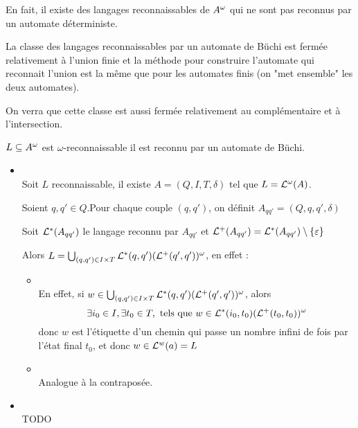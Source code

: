 En fait, il existe des langages reconnaissables de $A^{\omega}$ qui ne sont pas reconnus par un automate déterministe.



La classe des langages reconnaissables par un automate de Büchi est fermée relativement à l'union finie
et la méthode pour construire l'automate qui reconnait l'union est la même que pour les automates finis (on "met ensemble"
les deux automates).

On verra que cette classe est aussi fermée relativement au complémentaire et à l'intersection.


\begin{theorem}
	$L \subseteq A^{\omega}$ est $\omega$-reconnaissable \ssi il est reconnu par un automate de Büchi.
\end{theorem}

\begin{proofI}
	\begin{itemize}
		\item \bimpRL \\
		      Soit $L$ reconnaissable, il existe $A = (Q,I,T,\delta)$ tel que $L = \mathcal{L}^{\omega}(A)$.

		      Soient $q,q' \in Q$.Pour chaque couple $(q,q')$, on définit $A_{qq'} = (Q,q,q',\delta)$

		      Soit $\mathcal{L}^*(A_{qq'})$ le langage reconnu par $A_{qq'}$ et $\mathcal{L}^+(A_{qq'}) = \mathcal{L}^*(A_{qq'}) \setminus \left\{\varepsilon\right\}$


		      Alors $L = \bigcup_{(q,q') \in I \times T} \mathcal{L}^*(q,q')(\mathcal{L}^+(q',q'))^{\omega}$, en effet :

		      \begin{itemize}
			      \item \fbox{$\supseteq$} \\
			            En effet, si $w \in \bigcup_{(q,q') \in I \times T} \mathcal{L}^*(q,q')(\mathcal{L}^+(q',q'))^{\omega}$, alors
			            $$\exists i_0 \in I, \exists t_0 \in T, \text{ tels que } w \in \mathcal{L}^*(i_0,t_0)(\mathcal{L}^+(t_0,t_0))^{\omega}$$
			            donc $w$ est l'étiquette d'un chemin qui passe un nombre infini de fois par l'état final $t_0$, et donc
			            $w\in \mathcal{L}^w (a) = L$
			      \item \fbox{$\subseteq$} \\
			            Analogue à la contraposée.
		      \end{itemize}


		\item \bimpLR \\
		      TODO
	\end{itemize}
\end{proofI}
